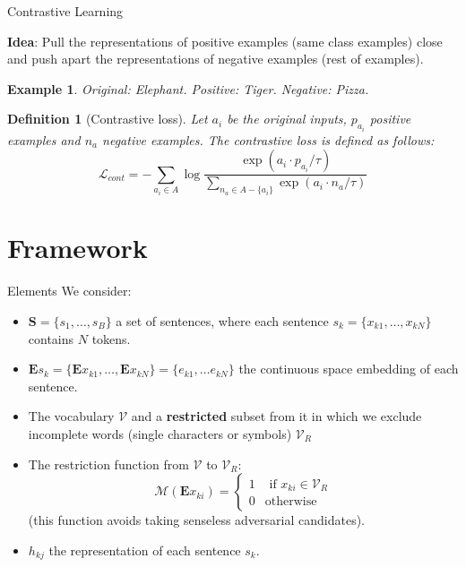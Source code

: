 \documentclass[aspectratio=169]{beamer}
\newtheorem{defi}{Definition}
\newtheorem{ex}{Example}
\begin{document}
  \begin{frame}{Contrastive Learning}
    
      {\color{Maroon}\textbf{Idea}:} Pull the representations of positive examples (same class examples) close and push apart the representations of negative examples (rest of examples).
    

    \begin{ex}
      Original: Elephant. Positive: Tiger. Negative: Pizza.
    \end{ex}

    \begin{defi}[Contrastive loss]
      Let \(a_i\) be the original inputs, \(p_{a_i}\) positive examples and \(n_{a}\) negative examples. The contrastive loss is defined as follows:
      \[
      \mathcal L_{cont} = - \sum_{a_i \in A} \log \frac{\exp(a_i \cdot p_{a_i}/\tau)}{\sum_{n_a \in A - \{ a_i \} } \exp(a_i \cdot n_a / \tau)}  
      \]
    \end{defi}
  \end{frame}


  \section{Framework}

  \begin{frame}{Elements}
    We consider:
    
    \begin{itemize}
    \item  \(\mathbf S = \{s_1,\dots,s_B\}\) a set of sentences, where each sentence \(s_k = \{x_{k1},\dots,x_{kN}\}\) contains \(N\) tokens.
    \pause
    \item \(\mathbf E s_k = \{\mathbf E x_{k1},\dots, \mathbf E x_{kN}\} = \{e_{k1},\dots e_{kN}\}\) the continuous space embedding of each sentence.
    \pause
    \item The vocabulary \(\mathcal V\) and a \textbf{restricted} subset from it in which we exclude incomplete words (single characters or symbols) \(\mathcal V_R\)
    \pause
    \item The restriction function from \(\mathcal V\) to \(\mathcal V_R\):
    \[
      \mathcal M (\mathbf E x_{ki}) = \begin{cases}1 & \text{ if } x_{ki}\in \mathcal V_R \\ 0 & \text{otherwise}\end{cases}
    \]
    (this function avoids taking senseless adversarial candidates).

    \pause
    \item  \(h_{kj}\) the representation of each sentence \(s_k\).

    \end{itemize}
  \end{frame}
\end{document}
